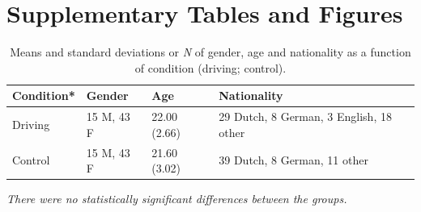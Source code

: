 \documentclass[authordate, empirical]{jote-new-article}
\begin{document}










\clearpage
\onecolumn

\section{Supplementary Tables and Figures}




\begin{table}[h]
  \caption{Means and standard deviations or \emph{N} of gender, age and nationality as a function of condition (driving; control).}
  \label{tab:s1}
  \begin{tabularx}{\textwidth}{@{} l l l X  @{}}

    \toprule
    \textbf{Condition*} &
    \textbf{Gender}     & \textbf{Age} &

    \textbf{Nationality }                                                                       \\
    \midrule

    Driving             & 15 M, 43 F   & 22.00 (2.66) & 29 Dutch, 8 German, 3 English, 18 other
    \\
    Control             & 15 M, 43 F   & 21.60 (3.02) & 39 Dutch, 8 German, 11 other
    \\
    \bottomrule
  \end{tabularx}
  \emph{\small  *There were no statistically significant differences between the groups.}
\end{table}
\end{document}
